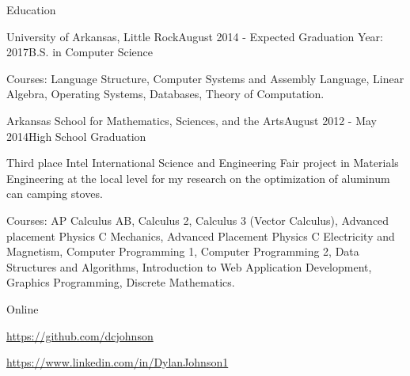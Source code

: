 \documentclass{resume} %
\begin{document}

\begin{rSection}{Education}

\begin{rSubsection}{University of Arkansas, Little Rock}{August 2014 - Expected Graduation Year: 2017}{B.S. in Computer Science}

	\item Courses: Language Structure, Computer Systems and Assembly Language, Linear Algebra, Operating Systems, Databases, Theory of Computation.
\end{rSubsection}

\begin{rSubsection}{Arkansas School for Mathematics, Sciences, and the Arts}{August 2012 - May 2014}{High School Graduation}

	\item Third place Intel International Science and Engineering Fair project in Materials Engineering at the local level for my research on the optimization of aluminum can camping stoves.
	\item Courses: AP Calculus AB, Calculus 2, Calculus 3 (Vector Calculus), Advanced placement Physics C Mechanics, Advanced Placement Physics C Electricity and Magnetism, Computer Programming 1, Computer Programming 2, Data Structures and Algorithms, Introduction to Web Application Development, Graphics Programming, Discrete Mathematics.
\end{rSubsection}

\end{rSection}

\clearpage

\begin{rSection}{Online}

	\item {\href{https://github.com/dcjohnson}{https://github.com/dcjohnson}}
	\item {\href{https://www.linkedin.com/in/DylanJohnson1}{https://www.linkedin.com/in/DylanJohnson1}}
\end{rSection}
\end{document}
